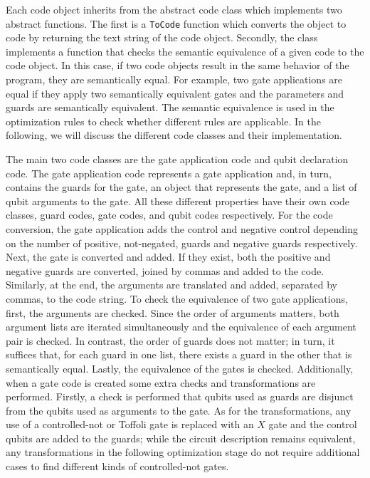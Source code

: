 Each code object inherits from the abstract code class which implements two abstract functions. The first is a \texttt{ToCode} function which converts the object to code by returning the text string of the code object. Secondly, the class implements a function that checks the semantic equivalence of a given code to the code object. In this case, if two code objects result in the same behavior of the program, they are semantically equal. For example, two gate applications are equal if they apply two semantically equivalent gates and the parameters and guards are semantically equivalent. The semantic equivalence is used in the optimization rules to check whether different rules are applicable. In the following, we will discuss the different code classes and their implementation. 

The main two code classes are the gate application code and qubit declaration code. The gate application code represents a gate application and, in turn, contains the guards for the gate, an object that represents the gate, and a list of qubit arguments to the gate. All these different properties have their own code classes, guard codes, gate codes, and qubit codes respectively. For the code conversion, the gate application adds the control and negative control depending on the number of positive, \ie not-negated, guards and negative guards respectively. Next, the gate is converted and added. If they exist, both the positive and negative guards are converted, joined by commas and added to the code. Similarly, at the end, the arguments are translated and added, separated by commas, to the code string. To check the equivalence of two gate applications, first, the arguments are checked. 
Since the order of arguments matters, both argument lists are iterated simultaneously and the equivalence of each argument pair is checked. In contrast, the order of guards does not matter; in turn, it suffices that, for each guard in one list, there exists a guard in the other that is semantically equal. Lastly, the equivalence of the gates is checked. 
Additionally, when a gate code is created some extra checks and transformations are performed. Firstly, a check is performed that qubits used as guards are disjunct from the qubits used as arguments to the gate. As for the transformations, any use of a controlled-not or Toffoli gate is replaced with an $X$ gate and the control qubits are added to the guards; while the circuit description remains equivalent, any transformations in the following optimization stage do not require additional cases to find different kinds of controlled-not gates.  

